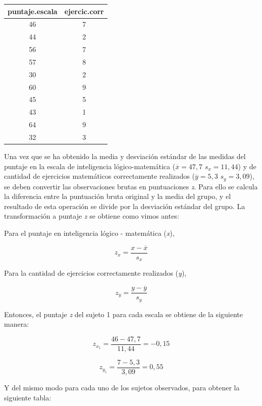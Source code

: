 \documentclass[]{book}
\begin{document}
\begin{longtable}[]{@{}cc@{}}
\toprule
puntaje.escala & ejercic.corr\tabularnewline
\midrule
\endhead
46 & 7\tabularnewline
44 & 2\tabularnewline
56 & 7\tabularnewline
57 & 8\tabularnewline
30 & 2\tabularnewline
60 & 9\tabularnewline
45 & 5\tabularnewline
43 & 1\tabularnewline
64 & 9\tabularnewline
32 & 3\tabularnewline
\bottomrule
\end{longtable}

Una vez que se ha obtenido la media y desviación estándar de las medidas
del puntaje en la escala de inteligencia lógico-matemática
(\(\overline{x} = 47,7\) \(s_{x} = 11,44\)) y de cantidad de ejercicios
matemáticos correctamente realizados
(\(\overline{y} = 5,3\) \(s_{y} = 3,09\)), se deben convertir las
observaciones brutas en puntuaciones \emph{z}. Para ello se calcula la
diferencia entre la puntuación bruta original y la media del grupo, y el
resultado de esta operación se divide por la desviación estándar del
grupo. La transformación a puntaje \emph{z} se obtiene como vimos antes:

Para el puntaje en inteligencia lógico - matemática (\emph{x}),

\[z_{x} = \frac{x - \overline{x}}{s_{x}}\]

Para la cantidad de ejercicios correctamente realizados (\emph{y}),

\[z_{y} = \frac{y - \overline{y}}{s_{y}}\]

Entonces, el puntaje \emph{z} del sujeto 1 para cada escala se obtiene de la siguiente manera:

\[z_{x_{1}} = \frac{46 - 47,7}{11,44} = - 0,15\]

\[z_{y_{1}} = \frac{7 - 5,3}{3,09} = 0,55\]

Y del mismo modo para cada uno de los sujetos observados, para obtener la siguiente tabla:


\end{document}
